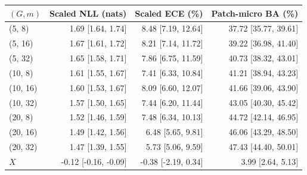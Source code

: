 \begin{tabular}{@{}lrrr@{}}
\toprule
$(G, m)$ & Scaled NLL (nats) & Scaled ECE (\%) & Patch-micro BA (\%) \\
\midrule
(5, 8) & 1.69 [1.64, 1.74] & 8.48 [7.19, 12.64] & 37.72 [35.77, 39.61] \\
(5, 16) & 1.67 [1.61, 1.72] & 8.21 [7.14, 11.72] & 39.22 [36.98, 41.40] \\
(5, 32) & 1.65 [1.58, 1.71] & 7.86 [6.75, 11.59] & 40.73 [38.32, 43.01] \\
(10, 8) & 1.61 [1.55, 1.67] & 7.41 [6.33, 10.84] & 41.21 [38.94, 43.23] \\
(10, 16) & 1.60 [1.53, 1.67] & 8.09 [6.60, 12.07] & 41.66 [39.06, 43.90] \\
(10, 32) & 1.57 [1.50, 1.65] & 7.44 [6.20, 11.44] & 43.05 [40.30, 45.42] \\
(20, 8) & 1.52 [1.46, 1.59] & 7.48 [6.34, 10.13] & 44.72 [42.14, 46.95] \\
(20, 16) & 1.49 [1.42, 1.56] & 6.48 [5.65, 9.81] & 46.06 [43.29, 48.50] \\
(20, 32) & 1.47 [1.39, 1.55] & 5.73 [5.06, 9.59] & 47.43 [44.40, 50.01] \\
$X$ & -0.12 [-0.16, -0.09] & -0.38 [-2.19, 0.34] & 3.99 [2.64, 5.13] \\
\bottomrule
\end{tabular}

